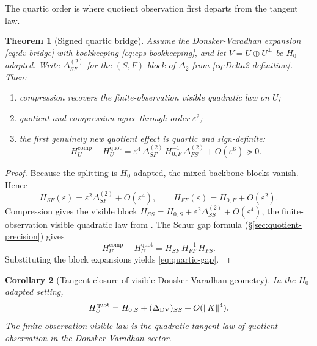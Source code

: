 \documentclass[11pt]{article}
\numberwithin{equation}{section}
\DeclarePairedDelimiter{\norm}{\lVert}{\rVert}
\newcommand{\eps}{\varepsilon}
\theoremstyle{thmcompact}
\newtheorem{theorem}{Theorem}[section]
\newtheorem{corollary}[theorem]{Corollary}
\theoremstyle{remark}
\begin{document}
The quartic order is where quotient observation first departs from the tangent law.

\begin{theorem}[Signed quartic bridge]
\label{thm:quartic-bridge}
Assume the Donsker-Varadhan expansion \eqref{eq:dv-bridge} with bookkeeping \eqref{eq:eps-bookkeeping}, and let $V = U \oplus U^{\perp}$ be $H_0$-adapted. Write $\Delta_{SF}^{(2)}$ for the $(S,F)$ block of $\Delta_2$ from \eqref{eq:Delta2-definition}. Then:
\begin{enumerate}
\item compression recovers the finite-observation visible quadratic law on $U$;
\item quotient and compression agree through order $\eps^2$;
\item the first genuinely new quotient effect is quartic and sign-definite:
\begin{equation}
H_U^{\mathrm{comp}} - H_U^{\mathrm{quot}}
=
\eps^4\, \Delta_{SF}^{(2)}\, H_{0,F}^{-1}\, \Delta_{FS}^{(2)} + O(\eps^6) \succeq 0.
\label{eq:quartic-gap}
\end{equation}
\end{enumerate}
\end{theorem}

\begin{proof}
Because the splitting is $H_0$-adapted, the mixed backbone blocks vanish. Hence
\[
H_{SF}(\eps) = \eps^2 \Delta_{SF}^{(2)} + O(\eps^4),
\qquad
H_{FF}(\eps) = H_{0,F} + O(\eps^2).
\]
Compression gives the visible block $H_{SS} = H_{0,S} + \eps^2 \Delta_{SS}^{(2)} + O(\eps^4)$, the finite-observation visible quadratic law from \cite{Dunkley2026FiniteObservation}. The Schur gap formula (\S\ref{sec:quotient-precision}) gives
\[
H_U^{\mathrm{comp}} - H_U^{\mathrm{quot}} = H_{SF}\, H_{FF}^{-1}\, H_{FS}.
\]
Substituting the block expansions yields \eqref{eq:quartic-gap}.
\end{proof}

\begin{corollary}[Tangent closure of visible Donsker-Varadhan geometry]
\label{cor:tangent-closure}
In the $H_0$-adapted setting,
\begin{equation}
H_U^{\mathrm{quot}} = H_{0,S} + (\Delta_{\mathrm{DV}})_{SS} + O(\norm{K}^4).
\label{eq:tangent-closure}
\end{equation}
The finite-observation visible law is the quadratic tangent law of quotient observation in the Donsker-Varadhan sector.
\end{corollary}
\end{document}
